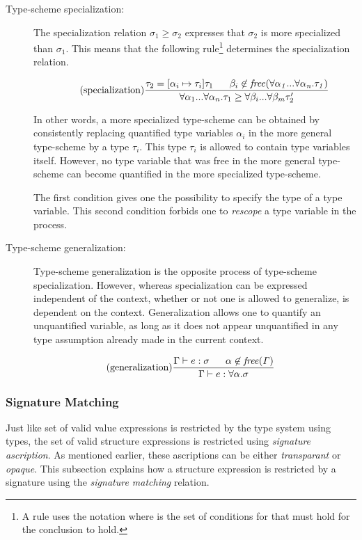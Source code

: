 \begin{description}
\item[Type-scheme specialization:]
The specialization relation $\sigma_{1} \geq \sigma_{2}$ expresses that $\sigma_{2}$ is more specialized than $\sigma_{1}$. This means that the following rule\footnote{A rule uses the notation  where  is the set of conditions for that must hold for the conclusion to hold.} determines the specialization relation.
%

\[
\tag{specialization}
\frac{\tau_{2}=[\alpha_{i} \mapsto \tau_{i}]\tau_{1} \;\;\;\;\;\; \beta_{i} \not\in\mathit{free(\forall\alpha_{1}...\forall \alpha_{n}.\tau_{1})}}
{\forall\alpha_{1}...\forall\alpha_{n}.\tau_{1}\geq \forall \beta_{i}...\forall \beta_{m}\tau_{2}'}
\]

In other words, a more specialized type-scheme can be obtained by consistently replacing quantified type variables $\alpha_{i}$ in the more general type-scheme by a type $\tau_{i}$.
This type $\tau_{i}$ is allowed to contain type variables itself.
However, no type variable that was free in the more general type-scheme can become quantified in the more specialized type-scheme.

The first condition gives one the possibility to specify the type of a type variable. This second condition forbids one to \emph{rescope} a type variable in the process.

\item[Type-scheme generalization:]
Type-scheme generalization is the opposite process of type-scheme specialization. However, whereas specialization can be expressed independent of the context, whether or not one is allowed to generalize, is dependent on the context. Generalization allows one to quantify an unquantified variable, as long as it does not appear unquantified in any type assumption already made in the current context.
\end{description}

\[
\tag{generalization}
\frac{\Gamma \vdash e:\sigma \;\;\;\;\;\; \alpha \not\in \mathit{free(\Gamma)}}{\Gamma \vdash e : \forall \alpha . \sigma}
\]

\subsubsection{Signature Matching}
\label{sec:StructuralTyping}
Just like set of valid value expressions  is restricted by the type system using types, the set of valid structure expressions is restricted using \emph{signature ascription}. As mentioned earlier, these ascriptions can be either \emph{transparant} or \emph{opaque}.
This subsection explains how a structure expression is restricted by a signature using the \emph{signature matching} relation.

